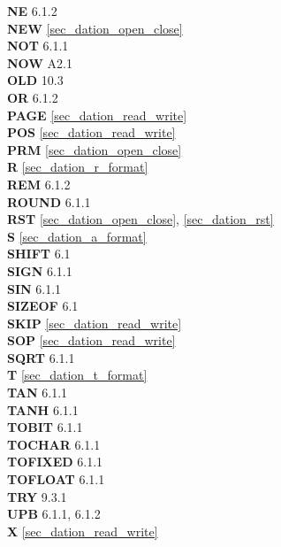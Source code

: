 {{\bf NE} 6.1.2\\
{\bf NEW} \ref{sec_dation_open_close}\\
{\bf NOT} 6.1.1\\
{\bf NOW} A2.1\\
 
{\bf OLD} 10.3\\
{\bf OR} 6.1.2\\
 
{\bf PAGE} \ref{sec_dation_read_write}\\
{\bf POS} \ref{sec_dation_read_write}\\
{\bf PRM} \ref{sec_dation_open_close}\\
 
{\bf R} \ref{sec_dation_r_format}\\
{\bf REM} 6.1.2\\
{\bf ROUND} 6.1.1\\
{\bf RST} \ref{sec_dation_open_close}, \ref{sec_dation_rst} \\
 
{\bf S} \ref{sec_dation_a_format}\\
{\bf SHIFT} 6.1\\
{\bf SIGN} 6.1.1\\
{\bf SIN} 6.1.1\\
{\bf SIZEOF} 6.1\\
{\bf SKIP} \ref{sec_dation_read_write} \\
{\bf SOP}  \ref{sec_dation_read_write}\\
{\bf SQRT} 6.1.1\\
 
{\bf T} \ref{sec_dation_t_format}\\
{\bf TAN} 6.1.1\\
{\bf TANH} 6.1.1\\
{\bf TOBIT} 6.1.1\\
{\bf TOCHAR} 6.1.1\\
{\bf TOFIXED} 6.1.1\\
{\bf TOFLOAT} 6.1.1\\
{\bf TRY} 9.3.1\\
 
{\bf UPB} 6.1.1, 6.1.2\\

{\bf X} \ref{sec_dation_read_write}
}

